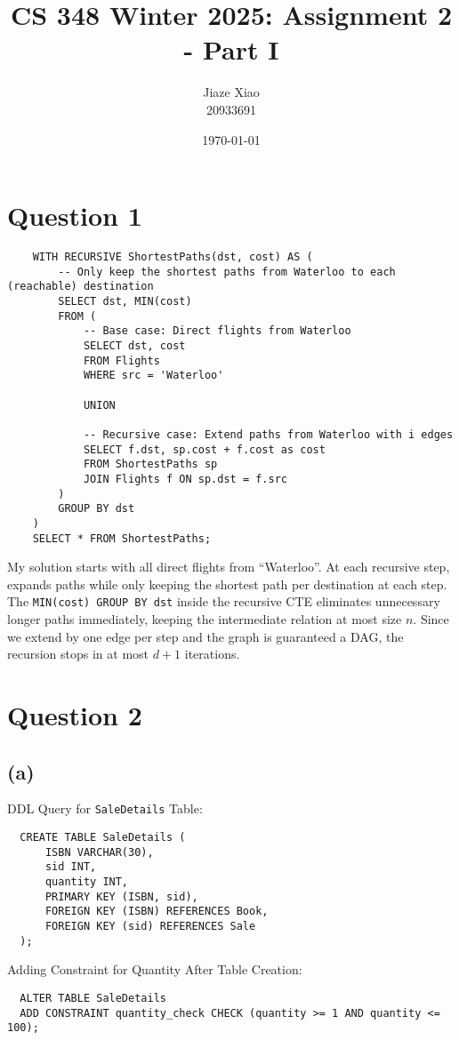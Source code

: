 \documentclass{article}
\title{\textbf{CS 348 Winter 2025: Assignment 2 - Part I}}
\author{Jiaze Xiao \\ 20933691}
\date{\today}
\begin{document}
\maketitle

\section*{Question 1}
\begin{lstlisting}
    WITH RECURSIVE ShortestPaths(dst, cost) AS (
        -- Only keep the shortest paths from Waterloo to each (reachable) destination
        SELECT dst, MIN(cost)
        FROM (
            -- Base case: Direct flights from Waterloo
            SELECT dst, cost
            FROM Flights
            WHERE src = 'Waterloo'

            UNION

            -- Recursive case: Extend paths from Waterloo with i edges
            SELECT f.dst, sp.cost + f.cost as cost
            FROM ShortestPaths sp
            JOIN Flights f ON sp.dst = f.src
        )
        GROUP BY dst
    )
    SELECT * FROM ShortestPaths;
\end{lstlisting}
My solution starts with all direct flights from ``Waterloo''. At each recursive step, expands paths while only keeping the shortest path per destination at each step. The \texttt{MIN(cost) GROUP BY dst} inside the recursive CTE eliminates unnecessary longer paths immediately, keeping the intermediate relation at most size $n$. Since we extend by one edge per step and the graph is guaranteed a DAG, the recursion stops in at most $d+1$ iterations.

\newpage
\section*{Question 2}
\subsection*{(a)}
DDL Query for \texttt{SaleDetails} Table:
\begin{lstlisting}
  CREATE TABLE SaleDetails (
      ISBN VARCHAR(30),
      sid INT,
      quantity INT,
      PRIMARY KEY (ISBN, sid),
      FOREIGN KEY (ISBN) REFERENCES Book,
      FOREIGN KEY (sid) REFERENCES Sale
  );
\end{lstlisting}
Adding Constraint for Quantity After Table Creation:
\begin{lstlisting}
  ALTER TABLE SaleDetails
  ADD CONSTRAINT quantity_check CHECK (quantity >= 1 AND quantity <= 100);
\end{lstlisting}
\end{document}
